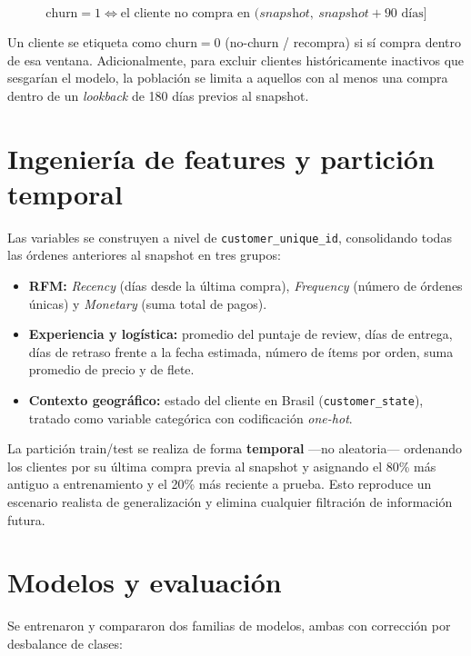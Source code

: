 \documentclass[11pt]{article}
\begin{document}
\[
  \text{churn} = 1 \iff \text{el cliente no compra en } (\textit{snapshot},\ \textit{snapshot} + 90\text{ días}]
\]

Un cliente se etiqueta como $\text{churn}=0$ (no-churn / recompra) si sí compra dentro de esa
ventana. Adicionalmente, para excluir clientes históricamente inactivos que sesgarían el
modelo, la población se limita a aquellos con al menos una compra dentro de un
\textit{lookback} de 180 días previos al snapshot.

\section{Ingeniería de features y partición temporal}

Las variables se construyen a nivel de \texttt{customer\_unique\_id}, consolidando todas las
órdenes anteriores al snapshot en tres grupos:

\begin{itemize}[leftmargin=1.5em]
  \item \textbf{RFM:} \textit{Recency} (días desde la última compra), \textit{Frequency}
        (número de órdenes únicas) y \textit{Monetary} (suma total de pagos).
  \item \textbf{Experiencia y logística:} promedio del puntaje de review, días de entrega,
        días de retraso frente a la fecha estimada, número de ítems por orden, suma promedio
        de precio y de flete.
  \item \textbf{Contexto geográfico:} estado del cliente en Brasil
        (\texttt{customer\_state}), tratado como variable categórica con codificación
        \textit{one-hot}.
\end{itemize}

La partición train/test se realiza de forma \textbf{temporal} —no aleatoria— ordenando los
clientes por su última compra previa al snapshot y asignando el 80\% más antiguo a
entrenamiento y el 20\% más reciente a prueba. Esto reproduce un escenario realista de
generalización y elimina cualquier filtración de información futura.

\section{Modelos y evaluación}

Se entrenaron y compararon dos familias de modelos, ambas con corrección por desbalance de
clases:
\end{document}
